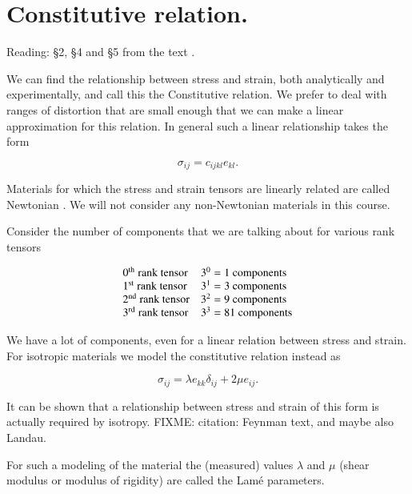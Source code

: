 \section{Constitutive relation.}

Reading: \S 2, \S 4 and \S 5 from the text \cite{landau1960theory}.

We can find the relationship between stress and strain, both analytically and experimentally, and call this the Constitutive relation.  We prefer to deal with ranges of distortion that are small enough that we can make a linear approximation for this relation.  In general such a linear relationship takes the form

\begin{equation}\label{eqn:continuumL5:70}
\sigma_{ij} = c_{ijkl} e_{kl}.
\end{equation}

Materials for which the stress and strain tensors are linearly related are called Newtonian .  We will not consider any non-Newtonian materials in this course.

Consider the number of components that we are talking about for various rank tensors

\begin{equation}\label{eqn:continuumL5:90}
\begin{array}{l l}
\mbox{$0^\text{th}$ rank tensor} & \mbox{$3^0 = 1$ components} \\
\mbox{$1^\text{st}$ rank tensor} & \mbox{$3^1 = 3$ components} \\
\mbox{$2^\text{nd}$ rank tensor} & \mbox{$3^2 = 9$ components} \\
\mbox{$3^\text{rd}$ rank tensor} & \mbox{$3^3 = 81$ components}
\end{array}
\end{equation}

We have a lot of components, even for a linear relation between stress and strain.  For isotropic materials we model the constitutive relation instead as

\begin{equation}\label{eqn:continuumL5:110}
\boxed{
\sigma_{ij} = \lambda e_{kk} \delta_{ij} + 2 \mu e_{ij}.
}
\end{equation}

It can be shown that a relationship between stress and strain of this form is actually required by isotropy.
FIXME: citation: Feynman text, and maybe also Landau.

For such a modeling of the material the (measured) values $\lambda$ and $\mu$ (shear modulus or modulus of rigidity) are called the Lam\'e parameters.

